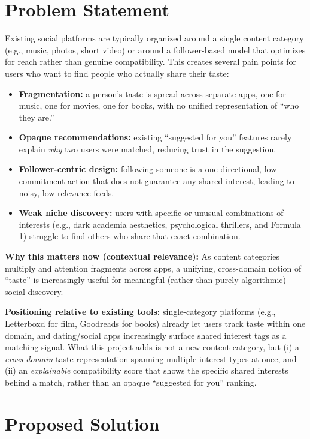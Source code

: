 \documentclass[11pt,a4paper]{article}
\begin{document}
\section{Problem Statement}
Existing social platforms are typically organized around a single content category (e.g.,
music, photos, short video) or around a follower-based model that optimizes for reach rather
than genuine compatibility. This creates several pain points for users who want to find
people who actually share their taste:
\begin{itemize}[leftmargin=0.7cm]
    \item \textbf{Fragmentation:} a person's taste is spread across separate apps, one for music, one for movies, one for books, with no unified representation of ``who they are.''
    \item \textbf{Opaque recommendations:} existing ``suggested for you'' features rarely explain \emph{why} two users were matched, reducing trust in the suggestion.
    \item \textbf{Follower-centric design:} following someone is a one-directional, low-commitment action that does not guarantee any shared interest, leading to noisy, low-relevance feeds.
    \item \textbf{Weak niche discovery:} users with specific or unusual combinations of interests (e.g., dark academia aesthetics, psychological thrillers, and Formula 1) struggle to find others who share that exact combination.
\end{itemize}

\textbf{Why this matters now (contextual relevance):} As content categories multiply and attention fragments across apps, a unifying, cross-domain notion of ``taste'' is increasingly useful for meaningful (rather than purely algorithmic) social discovery.

\textbf{Positioning relative to existing tools:} single-category platforms (e.g., Letterboxd for
film, Goodreads for books) already let users track taste within one domain, and dating/social
apps increasingly surface shared interest tags as a matching signal. What this project adds is
not a new content category, but (i) a \emph{cross-domain} taste representation spanning multiple
interest types at once, and (ii) an \emph{explainable} compatibility score that shows the
specific shared interests behind a match, rather than an opaque ``suggested for you'' ranking.

\section{Proposed Solution}
\end{document}
